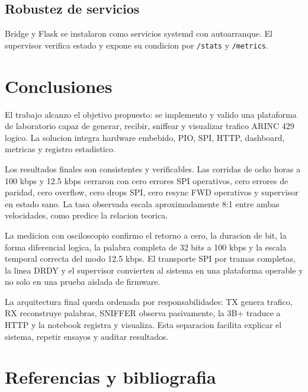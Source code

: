 \documentclass[12pt,a4paper,oneside]{report}
\begin{document}
\section{Robustez de servicios}

Bridge y Flask se instalaron como servicios systemd con autoarranque. El
supervisor verifica estado y expone su condicion por \texttt{/stats} y
\texttt{/metrics}.

\chapter{Conclusiones}

El trabajo alcanzo el objetivo propuesto: se implemento y valido una plataforma
de laboratorio capaz de generar, recibir, sniffear y visualizar trafico ARINC
429 logico. La solucion integra hardware embebido, PIO, SPI, HTTP, dashboard,
metricas y registro estadistico.

Los resultados finales son consistentes y verificables. Las corridas de ocho
horas a 100 kbps y 12.5 kbps cerraron con cero errores SPI operativos, cero
errores de paridad, cero overflow, cero drops SPI, cero resync FWD operativos y
supervisor en estado sano. La tasa observada escala aproximadamente 8:1 entre
ambas velocidades, como predice la relacion teorica.

La medicion con osciloscopio confirmo el retorno a cero, la duracion de bit, la
forma diferencial logica, la palabra completa de 32 bits a 100 kbps y la escala
temporal correcta del modo 12.5 kbps. El transporte SPI por tramas completas, la
linea DRDY y el supervisor convierten al sistema en una plataforma operable y
no solo en una prueba aislada de firmware.

La arquitectura final queda ordenada por responsabilidades: TX genera trafico,
RX reconstruye palabras, SNIFFER observa pasivamente, la 3B+ traduce a HTTP y
la notebook registra y visualiza. Esta separacion facilita explicar el sistema,
repetir ensayos y auditar resultados.

\chapter{Referencias y bibliografia}
\end{document}
